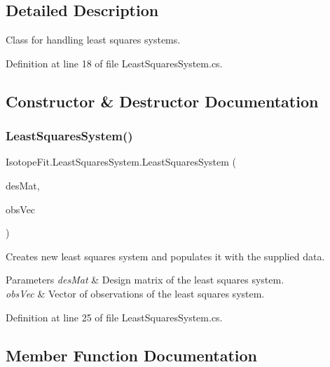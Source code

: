\subsection{Detailed Description}
Class for handling least squares systems. 



Definition at line 18 of file Least\+Squares\+System.\+cs.



\subsection{Constructor \& Destructor Documentation}
\mbox{\label{class_isotope_fit_1_1_least_squares_system_a5e014a3cc9f4ee7b700d89de2d1f2a4d}} 
\subsubsection{\texorpdfstring{Least\+Squares\+System()}{LeastSquaresSystem()}}
{\footnotesize\ttfamily Isotope\+Fit.\+Least\+Squares\+System.\+Least\+Squares\+System (\begin{DoxyParamCaption}\item[{Sparse\+Matrix}]{des\+Mat,  }\item[{Math\+Net.\+Numerics.\+Linear\+Algebra.\+Double.\+Sparse\+Vector}]{obs\+Vec }\end{DoxyParamCaption})}



Creates new least squares system and populates it with the supplied data. 


\begin{DoxyParams}{Parameters}
{\em des\+Mat} & Design matrix of the least squares system.\\
\hline
{\em obs\+Vec} & Vector of observations of the least squares system.\\
\hline
\end{DoxyParams}


Definition at line 25 of file Least\+Squares\+System.\+cs.



\subsection{Member Function Documentation}
\mbox{\label{class_isotope_fit_1_1_least_squares_system_ac72b8568e9ecb97077102658f56aba3f}} 

